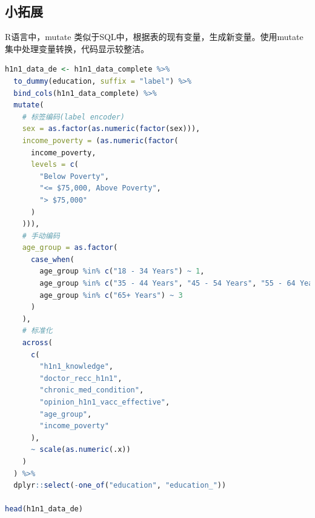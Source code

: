 \documentclass[]{ctexbook}
\begin{document}
\hypertarget{ux5c0fux62d3ux5c55}{%
\subsection{小拓展}\label{ux5c0fux62d3ux5c55}}

R语言中，mutate 类似于SQL中，根据表的现有变量，生成新变量。使用mutate集中处理变量转换，代码显示较整洁。

\begin{lstlisting}[language=R]
h1n1_data_de <- h1n1_data_complete %>%
  to_dummy(education, suffix = "label") %>%
  bind_cols(h1n1_data_complete) %>%
  mutate(
    # 标签编码(label encoder)
    sex = as.factor(as.numeric(factor(sex))),
    income_poverty = (as.numeric(factor(
      income_poverty,
      levels = c(
        "Below Poverty",
        "<= $75,000, Above Poverty",
        "> $75,000"
      )
    ))),
    # 手动编码
    age_group = as.factor(
      case_when(
        age_group %in% c("18 - 34 Years") ~ 1,
        age_group %in% c("35 - 44 Years", "45 - 54 Years", "55 - 64 Years") ~ 2,
        age_group %in% c("65+ Years") ~ 3
      )
    ),
    # 标准化
    across(
      c(
        "h1n1_knowledge",
        "doctor_recc_h1n1",
        "chronic_med_condition",
        "opinion_h1n1_vacc_effective",
        "age_group",
        "income_poverty"
      ),
      ~ scale(as.numeric(.x))
    )
  ) %>%
  dplyr::select(-one_of("education", "education_"))

head(h1n1_data_de)
\end{lstlisting}
\end{document}
